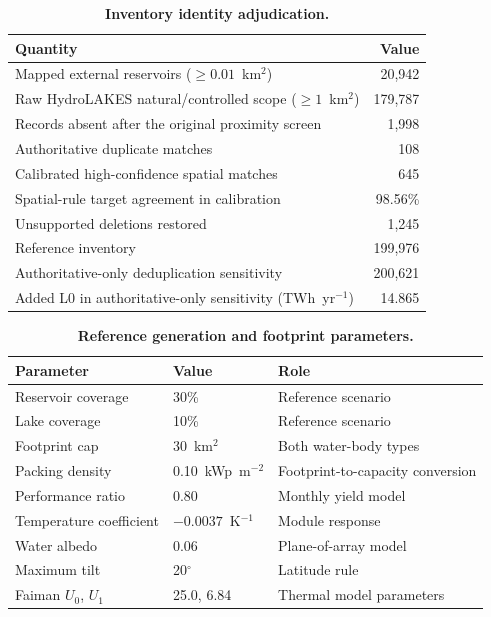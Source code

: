 \begin{table}[H]
\centering
\caption{\textbf{Inventory identity adjudication.}}
\label{tab:S2}
\begin{tabular}{lr}
\toprule
Quantity & Value \\
\midrule
Mapped external reservoirs ($\geq0.01$~km$^2$) & 20{,}942 \\
Raw HydroLAKES natural/controlled scope ($\geq1$~km$^2$) & 179{,}787 \\
Records absent after the original proximity screen & 1{,}998 \\
Authoritative duplicate matches & 108 \\
Calibrated high-confidence spatial matches & 645 \\
Spatial-rule target agreement in calibration & 98.56\% \\
Unsupported deletions restored & 1{,}245 \\
Reference inventory & 199{,}976 \\
Authoritative-only deduplication sensitivity & 200{,}621 \\
Added L0 in authoritative-only sensitivity (TWh~yr$^{-1}$) & 14.865 \\
\bottomrule
\end{tabular}
\end{table}

\begin{table}[H]
\centering
\caption{\textbf{Reference generation and footprint parameters.}}
\label{tab:S3}
\begin{tabular}{lll}
\toprule
Parameter & Value & Role \\
\midrule
Reservoir coverage & 30\% & Reference scenario \\
Lake coverage & 10\% & Reference scenario \\
Footprint cap & 30~km$^2$ & Both water-body types \\
Packing density & 0.10~kWp~m$^{-2}$ & Footprint-to-capacity conversion \\
Performance ratio & 0.80 & Monthly yield model \\
Temperature coefficient & $-0.0037$~K$^{-1}$ & Module response \\
Water albedo & 0.06 & Plane-of-array model \\
Maximum tilt & 20$^\circ$ & Latitude rule \\
Faiman $U_0$, $U_1$ & 25.0, 6.84 & Thermal model parameters \\
\bottomrule
\end{tabular}
\end{table}

